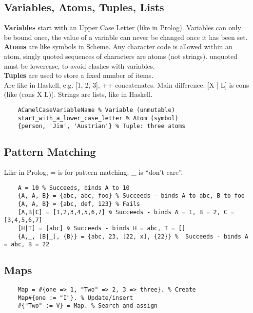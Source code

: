 \subsection{Variables, Atoms, Tuples, Lists}
\textbf{Variables} start with an Upper Case Letter (like in Prolog).
Variables can only be bound once, the value of a variable can never be changed once it has been set.\\
\textbf{Atoms} are like symbols in Scheme.
Any character code is allowed within an atom, singly quoted sequences of characters are atoms (not strings).
unquoted must be lowercase, to avoid clashes with variables.\\
\textbf{Tuples} are used to store a fixed number of items.\\
Are like in Haskell, e.g. [1, 2, 3], ++ concatenates.
Main difference: [X | L] is cons (like (cons X L)).
Strings are lists, like in Haskell.
\begin{lstlisting}
	ACamelCaseVariableName % Variable (unmutable)
	start_with_a_lower_case_letter % Atom (symbol)
	{person, 'Jim', 'Austrian'} % Tuple: three atoms
\end{lstlisting}

\subsection{Pattern Matching}
Like in Prolog, = is for pattern matching; \_ is “don’t care”.
\begin{lstlisting}
	A = 10 % Succeeds, binds A to 10
	{A, A, B} = {abc, abc, foo} % Succeeds - binds A to abc, B to foo
	{A, A, B} = {abc, def, 123} % Fails
	[A,B|C] = [1,2,3,4,5,6,7] % Succeeds - binds A = 1, B = 2, C = [3,4,5,6,7]
	[H|T] = [abc] % Succeeds - binds H = abc, T = []
	{A,_, [B|_], {B}} = {abc, 23, [22, x], {22}} % 	Succeeds - binds A = abc, B = 22
\end{lstlisting}

\subsection{Maps}
\begin{lstlisting}
	Map = #{one => 1, "Two" => 2, 3 => three}. % Create
	Map#{one := "I"}. % Update/insert
	#{"Two" := V} = Map. % Search and assign
\end{lstlisting}

